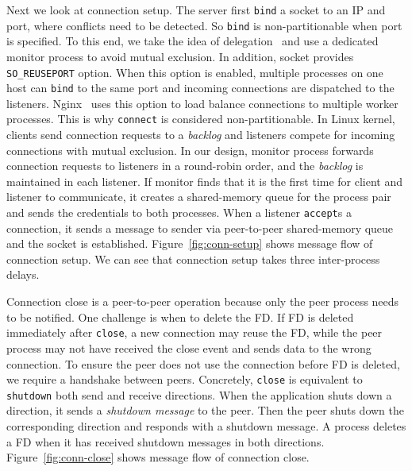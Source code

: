Next we look at connection setup. The server first \texttt{bind} a socket to an IP and port, where conflicts need to be detected. So \texttt{bind} is non-partitionable when port is specified. To this end, we take the idea of delegation~\cite{roghanchi2017ffwd} and use a dedicated monitor process to avoid mutual exclusion.
In addition, socket provides \texttt{SO\_REUSEPORT} option. When this option is enabled, multiple processes on one host can \texttt{bind} to the same port and incoming connections are dispatched to the listeners. Nginx~\cite{nginx} uses this option to load balance connections to multiple worker processes. This is why \texttt{connect} is considered non-partitionable. In Linux kernel, clients send connection requests to a \textit{backlog} and listeners compete for incoming connections with mutual exclusion. In our design, monitor process forwards connection requests to listeners in a round-robin order, and the \textit{backlog} is maintained in each listener. If monitor finds that it is the first time for client and listener to communicate, it creates a shared-memory queue for the process pair and sends the credentials to both processes. When a listener \texttt{accept}s a connection, it sends a message to sender via peer-to-peer shared-memory queue and the socket is established. Figure~\ref{fig:conn-setup} shows message flow of connection setup. We can see that connection setup takes three inter-process delays.

Connection close is a peer-to-peer operation because only the peer process needs to be notified. One challenge is when to delete the FD. If FD is deleted immediately after \texttt{close}, a new connection may reuse the FD, while the peer process may not have received the close event and sends data to the wrong connection. To ensure the peer does not use the connection before FD is deleted, we require a handshake between peers.
Concretely, \texttt{close} is equivalent to \texttt{shutdown} both send and receive directions. When the application shuts down a direction, it sends a \textit{shutdown message} to the peer. Then the peer shuts down the corresponding direction and responds with a shutdown message. A process deletes a FD when it has received shutdown messages in both directions. Figure~\ref{fig:conn-close} shows message flow of connection close.


